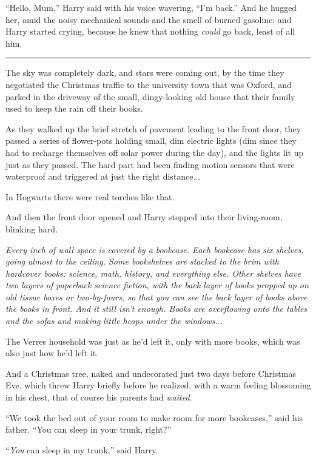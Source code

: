 ``Hello, Mum,'' Harry said with his voice wavering, ``I'm back.'' And he hugged her, amid the noisy mechanical sounds and the smell of burned gasoline; and Harry started crying, because he knew that nothing \emph{could} go back, least of all him.

\begin{center}\rule{3in}{0.4pt}\end{center}

The sky was completely dark, and stars were coming out, by the time they negotiated the Christmas traffic to the university town that was Oxford, and parked in the driveway of the small, dingy-looking old house that their family used to keep the rain off their books.

As they walked up the brief stretch of pavement leading to the front door, they passed a series of flower-pots holding small, dim electric lights (dim since they had to recharge themselves off solar power during the day), and the lights lit up just as they passed. The hard part had been finding motion sensors that were waterproof and triggered at just the right distance...

In Hogwarts there were real torches like that.

And then the front door opened and Harry stepped into their living-room, blinking hard.

\emph{Every inch of wall space is covered by a bookcase. Each bookcase has six shelves, going almost to the ceiling. Some bookshelves are stacked to the brim with hardcover books: science, math, history, and everything else. Other shelves have two layers of paperback science fiction, with the back layer of books propped up on old tissue boxes or two-by-fours, so that you can see the back layer of books above the books in front. And it still isn't enough. Books are overflowing onto the tables and the sofas and making little heaps under the windows...}

The Verres household was just as he'd left it, only with more books, which was also just how he'd left it.

And a Christmas tree, naked and undecorated just two days before Christmas Eve, which threw Harry briefly before he realized, with a warm feeling blossoming in his chest, that of course his parents had \emph{waited}.

``We took the bed out of your room to make room for more bookcases,'' said his father. ``You can sleep in your trunk, right?''

``\emph{You} can sleep in my trunk,'' said Harry.

